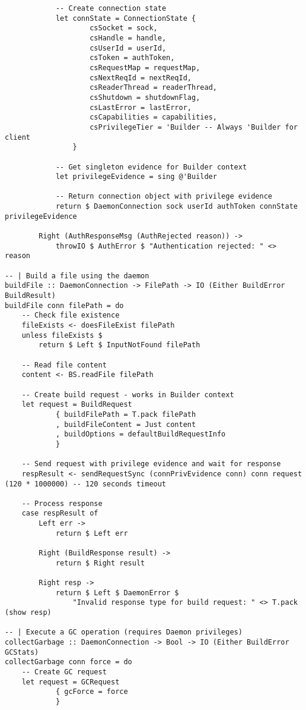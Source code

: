 \documentclass{article}
\begin{document}
\begin{tcolorbox}[title=Ten/Daemon/Client.hs Changes]
\begin{verbatim}
            -- Create connection state
            let connState = ConnectionState {
                    csSocket = sock,
                    csHandle = handle,
                    csUserId = userId,
                    csToken = authToken,
                    csRequestMap = requestMap,
                    csNextReqId = nextReqId,
                    csReaderThread = readerThread,
                    csShutdown = shutdownFlag,
                    csLastError = lastError,
                    csCapabilities = capabilities,
                    csPrivilegeTier = 'Builder -- Always 'Builder for client
                }

            -- Get singleton evidence for Builder context
            let privilegeEvidence = sing @'Builder

            -- Return connection object with privilege evidence
            return $ DaemonConnection sock userId authToken connState privilegeEvidence

        Right (AuthResponseMsg (AuthRejected reason)) ->
            throwIO $ AuthError $ "Authentication rejected: " <> reason

-- | Build a file using the daemon
buildFile :: DaemonConnection -> FilePath -> IO (Either BuildError BuildResult)
buildFile conn filePath = do
    -- Check file existence
    fileExists <- doesFileExist filePath
    unless fileExists $
        return $ Left $ InputNotFound filePath

    -- Read file content
    content <- BS.readFile filePath

    -- Create build request - works in Builder context
    let request = BuildRequest
            { buildFilePath = T.pack filePath
            , buildFileContent = Just content
            , buildOptions = defaultBuildRequestInfo
            }

    -- Send request with privilege evidence and wait for response
    respResult <- sendRequestSync (connPrivEvidence conn) conn request (120 * 1000000) -- 120 seconds timeout

    -- Process response
    case respResult of
        Left err ->
            return $ Left err

        Right (BuildResponse result) ->
            return $ Right result

        Right resp ->
            return $ Left $ DaemonError $
                "Invalid response type for build request: " <> T.pack (show resp)

-- | Execute a GC operation (requires Daemon privileges)
collectGarbage :: DaemonConnection -> Bool -> IO (Either BuildError GCStats)
collectGarbage conn force = do
    -- Create GC request
    let request = GCRequest
            { gcForce = force
            }


\end{verbatim}
\end{tcolorbox}
\end{document}
